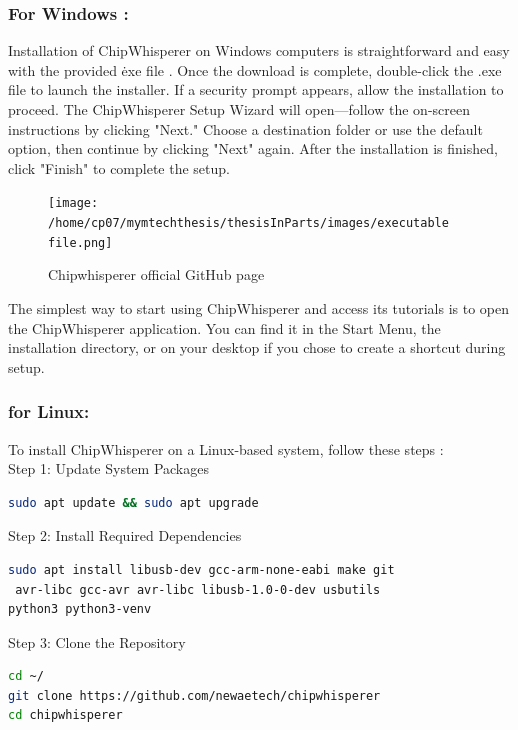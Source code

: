 \subsubsection{For Windows :}
Installation of ChipWhisperer on Windows computers is straightforward and easy with the provided \.exe file \cite{chipwhisperer2025}. Once the download is complete, double-click the .exe file to launch the installer. If a security prompt appears, allow the installation to proceed. The ChipWhisperer Setup Wizard will open—follow the on-screen instructions by clicking "Next." Choose a destination folder or use the default option, then continue by clicking "Next" again. After the installation is finished, click "Finish" to complete the setup.
\begin{figure}[h]
    \centering
    \texttt{[image: /home/cp07/mymtechthesis/thesisInParts/images/executable file.png]}
    \caption{Chipwhisperer official GitHub page}
    \label{fig:windows_installation}
\end{figure}
The simplest way to start using ChipWhisperer and access its tutorials is to open the ChipWhisperer application. You can find it in the Start Menu, the installation directory, or on your desktop if you chose to create a shortcut during setup.

\subsubsection{for Linux:}

To install ChipWhisperer on a Linux-based system, follow these steps \cite{chipwhisperer_linux_install}:\\

Step 1: Update System Packages\\
\begin{lstlisting}[language=bash]
sudo apt update && sudo apt upgrade
\end{lstlisting}

Step 2: Install Required Dependencies\\
\begin{lstlisting}[language=bash]
sudo apt install libusb-dev gcc-arm-none-eabi make git
 avr-libc gcc-avr avr-libc libusb-1.0-0-dev usbutils
python3 python3-venv
\end{lstlisting}

Step 3: Clone the Repository\\
\begin{lstlisting}[language=bash]
cd ~/
git clone https://github.com/newaetech/chipwhisperer
cd chipwhisperer
\end{lstlisting}

